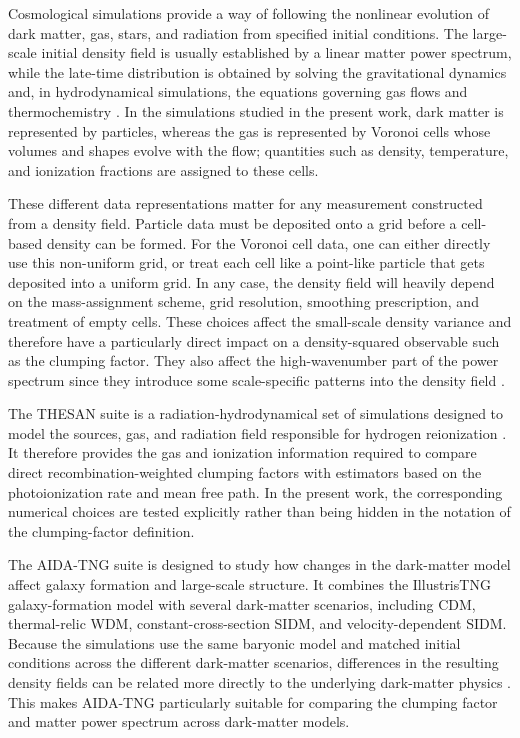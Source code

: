 \documentclass[%
 reprint,
nofootinbib,
 amsmath,amssymb,
 aps,
]{revtex4-2}
\begin{document}
Cosmological simulations provide a way of following the nonlinear evolution of dark matter, gas, stars, and radiation from specified initial conditions. The large-scale initial density field is usually established by a linear matter power spectrum, while the late-time distribution is obtained by solving the gravitational dynamics and, in hydrodynamical simulations, the equations governing gas flows and thermochemistry \cite{vogelsberger2019simulations}. In the simulations studied in the present work, dark matter is represented by particles, whereas the gas is represented by Voronoi cells whose volumes and shapes evolve with the flow; quantities such as density, temperature, and ionization fractions are assigned to these cells.

These different data representations matter for any measurement constructed from a density field. Particle data must be deposited onto a grid before a cell-based density can be formed. For the Voronoi cell data, one can either directly use this non-uniform grid, or treat each cell like a point-like particle that gets deposited into a uniform grid. In any case, the density field will heavily depend on the mass-assignment scheme, grid resolution, smoothing prescription, and treatment of empty cells. These choices affect the small-scale density variance and therefore have a particularly direct impact on a density-squared observable such as the clumping factor. They also affect the high-wavenumber part of the power spectrum since they introduce some scale-specific patterns into the density field \cite{springel2010arepo,jing2005correcting}.

The THESAN suite is a radiation-hydrodynamical set of simulations designed to model the sources, gas, and radiation field responsible for hydrogen reionization \cite{garaldi2022thesan}. It therefore provides the gas and ionization information required to compare direct recombination-weighted clumping factors with estimators based on the photoionization rate and mean free path. In the present work, the corresponding numerical choices are tested explicitly rather than being hidden in the notation of the clumping-factor definition.

The AIDA-TNG suite is designed to study how changes in the dark-matter model affect galaxy formation and large-scale structure. It combines the IllustrisTNG galaxy-formation model with several dark-matter scenarios, including CDM, thermal-relic WDM, constant-cross-section SIDM, and velocity-dependent SIDM. Because the simulations use the same baryonic model and matched initial conditions across the different dark-matter scenarios, differences in the resulting density fields can be related more directly to the underlying dark-matter physics \cite{despali2025aidatng}. This makes AIDA-TNG particularly suitable for comparing the clumping factor and matter power spectrum across dark-matter models.
\end{document}
